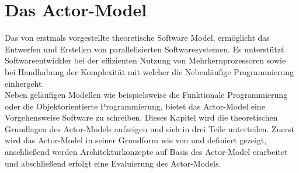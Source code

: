 \chapter{Das Actor-Model} \label{actor:chapter}
Das von \cite{hewitt1973session} erstmals vorgestellte theoretische Software Model, ermöglicht das Entwerfen und Erstellen von parallelisierten Softwaresystemen. Es unterstützt Softwareentwickler bei der effizienten Nutzung von Mehrkernprozessoren sowie bei Handhabung der  Komplexität mit welcher die Nebenläufige Programmierung einhergeht.   
\\
Neben geläufigen Modellen wie beispielsweise die Funktionale Programmierung oder die Objektorientierte Programmierung, bietet das Actor-Model eine Vorgehensweise Software zu schreiben. Dieses Kapitel wird die theoretischen Grundlagen des Actor-Models aufzeigen und sich in drei Teile unterteilen. Zuerst wird das Actor-Model in seiner Grundform wie von \cite{hewitt1973session} und \cite{Agha1985ActorsSystems} definiert gezeigt, anschließend werden Architekturkonzepte auf Basis des Actor-Model erarbeitet und abschließend erfolgt eine Evaluierung des Actor-Models.



